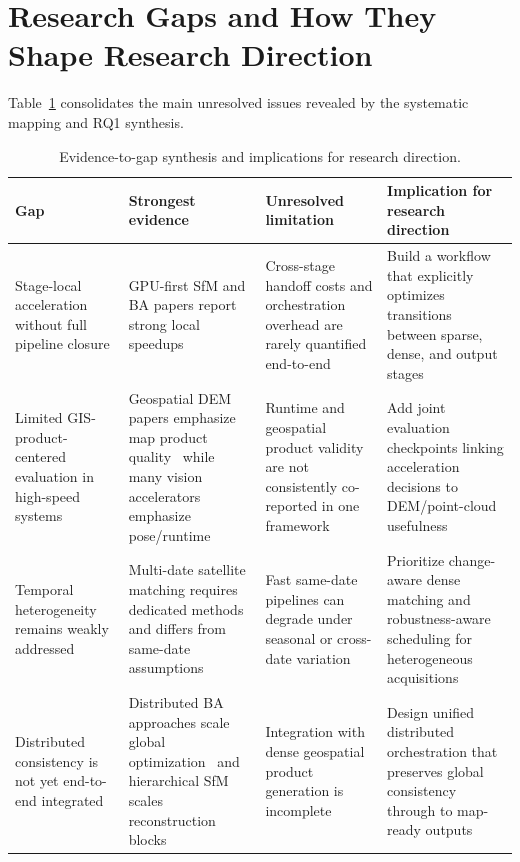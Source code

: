 \section{Research Gaps and How They Shape Research Direction}

Table~\ref{tab:evidence-gap} consolidates the main unresolved issues revealed by the systematic mapping and RQ1 synthesis.

\begin{table}[ht]
\centering
\caption{Evidence-to-gap synthesis and implications for research direction.}
\small
\begin{tabular}{p{}p{}p{}p{}}
\hline
\textbf{Gap} & \textbf{Strongest evidence} & \textbf{Unresolved limitation} & \textbf{Implication for research direction} \\
\hline
Stage-local acceleration without full pipeline closure & GPU-first SfM and BA papers report strong local speedups~\cite{Li2025FastMap,Zhong2025InstantSfM,Safari2025,Gopinath2025} & Cross-stage handoff costs and orchestration overhead are rarely quantified end-to-end & Build a workflow that explicitly optimizes transitions between sparse, dense, and output stages \\
Limited GIS-product-centered evaluation in high-speed systems & Geospatial DEM papers emphasize map product quality~\cite{deFranchis2014,Elias2025} while many vision accelerators emphasize pose/runtime & Runtime and geospatial product validity are not consistently co-reported in one framework & Add joint evaluation checkpoints linking acceleration decisions to DEM/point-cloud usefulness \\
Temporal heterogeneity remains weakly addressed & Multi-date satellite matching requires dedicated methods~\cite{Masquil2026} and differs from same-date assumptions~\cite{Amadei2025} & Fast same-date pipelines can degrade under seasonal or cross-date variation & Prioritize change-aware dense matching and robustness-aware scheduling for heterogeneous acquisitions \\
Distributed consistency is not yet end-to-end integrated & Distributed BA approaches scale global optimization~\cite{Zheng2023,Li2025BALM} and hierarchical SfM scales reconstruction blocks~\cite{Zhou2026} & Integration with dense geospatial product generation is incomplete & Design unified distributed orchestration that preserves global consistency through to map-ready outputs \\
\hline
\end{tabular}
\label{tab:evidence-gap}
\end{table}

